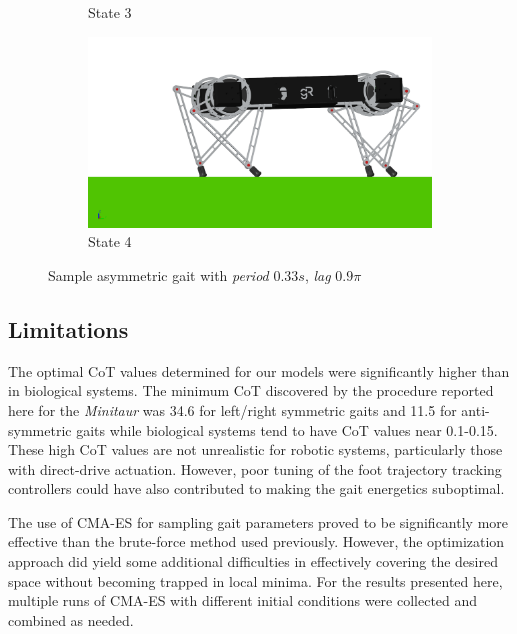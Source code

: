 \documentclass[conference,11pt,letterpaper]{IEEEtran}
\begin{document}
\begin{figure}[t!]
\begin{subfigure}[t]{0.45\linewidth}
        \caption{State 3}
    \end{subfigure}%
    \begin{subfigure}[t]{0.45\linewidth}
        \includegraphics[width=\textwidth]{asymm_snap4}
        \caption{State 4}
    \end{subfigure}%
    \caption{Sample asymmetric gait with \emph{period} $0.33 s$, \emph{lag} $0.9\pi$}
    \label{fig:asym_gait}
\end{figure}

\subsection{Limitations}
The optimal CoT values determined for our models were significantly higher than in biological systems. The minimum CoT discovered by the procedure reported here for the \emph{Minitaur} was 34.6 for left/right symmetric gaits and 11.5 for anti-symmetric gaits while biological systems tend to have CoT values near 0.1-0.15. These high CoT values are not unrealistic for robotic systems, particularly those with direct-drive actuation. However, poor tuning of the foot trajectory tracking controllers could have also contributed to making the gait energetics suboptimal.

The use of CMA-ES for sampling gait parameters proved to be significantly more effective than the brute-force method used previously. However, the optimization approach did yield some additional difficulties in effectively covering the desired space without becoming trapped in local minima. For the results presented here, multiple runs of CMA-ES with different initial conditions were collected and combined as needed.
\end{document}
